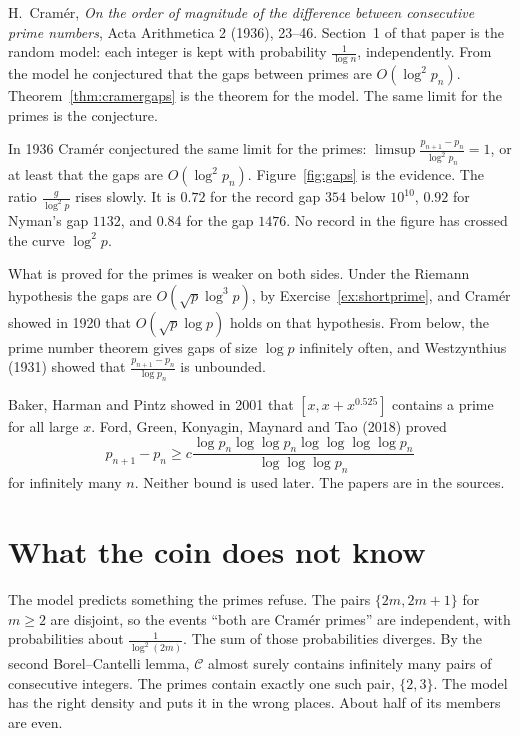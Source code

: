 \begin{remark}[Cramér, 1936]
H.~Cramér, \emph{On the order of magnitude of the difference between consecutive prime numbers}, Acta Arithmetica 2 (1936), 23--46. Section~1 of that paper is the random model: each integer is kept with probability $\frac1{\log n}$, independently. From the model he conjectured that the gaps between primes are $O(\log^2 p_n)$. Theorem~\ref{thm:cramergaps} is the theorem for the model. The same limit for the primes is the conjecture.
\end{remark}

In 1936 Cramér conjectured the same limit for the primes: $\limsup\frac{p_{n+1}-p_n}{\log^2p_n}=1$, or at least that the gaps are $O(\log^2 p_n)$. Figure~\ref{fig:gaps} is the evidence. The ratio $\frac g{\log^2 p}$ rises slowly. It is $0.72$ for the record gap $354$ below $10^{10}$, $0.92$ for Nyman's gap $1132$, and $0.84$ for the gap $1476$. No record in the figure has crossed the curve $\log^2 p$.

What is proved for the primes is weaker on both sides. Under the Riemann hypothesis the gaps are $O(\sqrt p\log^3 p)$, by Exercise~\ref{ex:shortprime}, and Cramér showed in 1920 that $O(\sqrt p\log p)$ holds on that hypothesis. From below, the prime number theorem gives gaps of size $\log p$ infinitely often, and Westzynthius (1931) showed that $\frac{p_{n+1}-p_n}{\log p_n}$ is unbounded.

\begin{remark}
Baker, Harman and Pintz showed in 2001 that $[x,x+x^{0.525}]$ contains a prime for all large $x$. Ford, Green, Konyagin, Maynard and Tao (2018) proved
\[
p_{n+1}-p_n\ge c\frac{\log p_n\log\log p_n\log\log\log\log p_n}{\log\log\log p_n}
\]
for infinitely many $n$. Neither bound is used later. The papers are in the sources.
\end{remark}

\section{What the coin does not know}

The model predicts something the primes refuse. The pairs $\{2m,2m+1\}$ for $m\ge2$ are disjoint, so the events ``both are Cramér primes'' are independent, with probabilities about $\frac1{\log^2(2m)}$. The sum of those probabilities diverges. By the second Borel--Cantelli lemma, $\mathcal C$ almost surely contains infinitely many pairs of consecutive integers. The primes contain exactly one such pair, $\{2,3\}$. The model has the right density and puts it in the wrong places. About half of its members are even.

